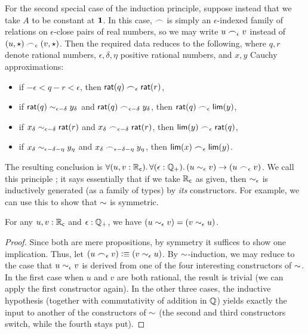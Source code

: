 For the second special case of the induction principle, suppose instead that we take $A$ to be constant at $\mathbf{1}$.
In this case, $\frown$ is simply an $\epsilon$-indexed family of relations on $\epsilon$-close pairs of real numbers, so we may write $u\frown_\epsilon v$ instead of $(u,\star)\frown_\epsilon (v,\star)$.
Then the required data reduces to the following, where $q, r$ denote rational numbers, $\epsilon, \delta, \eta$ positive rational numbers, and $x, y$ Cauchy approximations:
\begin{itemize}
\item if $-\epsilon < q - r < \epsilon$, then
  $\mathsf{rat}(q) \frown_\epsilon \mathsf{rat}(r)$,
\item if $\mathsf{rat}(q) \sim_{\epsilon - \delta} y_\delta$ and
  $\mathsf{rat}(q)\frown_{\epsilon-\delta} y_\delta$,
  then $\mathsf{rat}(q) \frown_\epsilon \mathsf{lim}(y)$,
\item if $x_\delta \sim_{\epsilon - \delta} \mathsf{rat}(r)$ and
  $x_\delta \frown_{\epsilon-\delta} \mathsf{rat}(r)$,
  then $\mathsf{lim}(y) \frown_\epsilon \mathsf{rat}(q)$,
\item if $x_\delta \sim_{\epsilon - \delta - \eta} y_\eta$ and
  $x_\delta\frown_{\epsilon - \delta - \eta} y_\eta$,
  then $\mathsf{lim}(x) \frown_\epsilon \mathsf{lim}(y)$.
\end{itemize}
The resulting conclusion is $\fall{u,v:\RC}{\epsilon:\Qp} (u\close\epsilon v) \to (u \bsim_\epsilon v)$.
We call this principle ; it says essentially that if we take $\mathbb{R}_\mathsf{c}$ as given, then $\sim_{\epsilon}$ is inductively generated (as a family of types) by \emph{its} constructors.
For example, we can use this to show that $\mathord\sim$ is symmetric.

\begin{lem}\label{thm:RCsim-symmetric}
  For any $u,v:\mathbb{R}_\mathsf{c}$ and $\epsilon:\mathbb{Q}_{+}$, we have $(u\sim_{\epsilon} v) = (v\sim_{\epsilon} u)$.
\end{lem}
\begin{proof}
  Since both are mere propositions, by symmetry it suffices to show one implication.
  Thus, let $(u\frown_\epsilon v) \vcentcolon\equiv (v\sim_{\epsilon} u)$.
  By $\mathord\sim$-induction, we may reduce to the case that $u\sim_{\epsilon} v$ is derived from one of the four interesting constructors of $\mathord\sim$.
  In the first case when $u$ and $v$ are both rational, the result is trivial (we can apply the first constructor again).
  In the other three cases, the inductive hypothesis (together with commutativity of addition in $\mathbb{Q}$) yields exactly the input to another of the constructors of $\mathord\sim$ (the second and third constructors switch, while the fourth stays put).
\end{proof}

